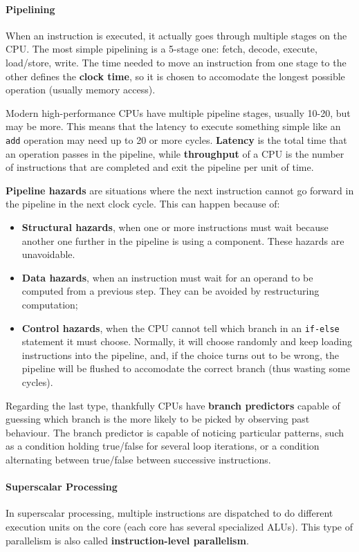 \paragraph{Pipelining}
When an instruction is executed, it actually goes through multiple stages on the CPU. The most simple pipelining is a 5-stage one: fetch, decode, execute, load/store, write. The time needed to move an instruction from one stage to the other defines the \textbf{clock time}, so it is chosen to accomodate the longest possible operation (usually memory access). 

Modern high-performance CPUs have multiple pipeline stages, usually 10-20, but may be more. This means that the latency to execute something simple like an \texttt{add} operation may need up to 20 or more cycles. \textbf{Latency} is the total time that an operation passes in the pipeline, while \textbf{throughput} of a CPU is the number of instructions that are completed and exit the pipeline per unit of time.

\textbf{Pipeline hazards} are situations where the next instruction cannot go forward in the pipeline in the next clock cycle. This can happen because of:
\begin{itemize}
    \item \textbf{Structural hazards}, when one or more instructions must wait because another one further in the pipeline is using a component. These hazards are unavoidable.
    \item \textbf{Data hazards}, when an instruction must wait for an operand to be computed from a previous step. They can be avoided by restructuring computation;
    \item \textbf{Control hazards}, when the CPU cannot tell which branch in an \texttt{if-else} statement it must choose. Normally, it will choose randomly and keep loading instructions into the pipeline, and, if the choice turns out to be wrong, the pipeline will be flushed to accomodate the correct branch (thus wasting some cycles).
\end{itemize}
Regarding the last type, thankfully CPUs have \textbf{branch predictors} capable of guessing which branch is the more likely to be picked by observing past behaviour. The branch predictor is capable of noticing particular patterns, such as a condition holding true/false for several loop iterations, or a condition alternating between true/false between successive instructions.

\paragraph{Superscalar Processing}
In superscalar processing, multiple instructions are dispatched to do different execution units on the core (each core has several specialized ALUs). This type of parallelism is also called \textbf{instruction-level parallelism}.

